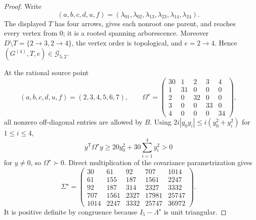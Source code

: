 \documentclass{article}
\begin{document}
\begin{proof}
Write
\[
 (a,b,c,d,u,f)=(\lambda_{01},\lambda_{02},\lambda_{13},
 \lambda_{23},\lambda_{14},\lambda_{24}).
\]
The displayed \(T\) has four arrows, gives each nonroot one parent, and reaches every vertex from \(0\); it is a rooted spanning arborescence.  Moreover \(D\setminus T=\{2\to3,2\to4\}\), the vertex order is topological, and \(e=2\to4\).  Hence \((G^{(4)},T,e)\in\mathcal G_{5,2}\).

At the rational source point
\[
 (a,b,c,d,u,f)=(2,3,4,5,6,7),
 \qquad
 \Omega^{\star}=
 \begin{pmatrix}
 30&1&2&3&4\\
 1&31&0&0&0\\
 2&0&32&0&0\\
 3&0&0&33&0\\
 4&0&0&0&34
 \end{pmatrix},
\tag{87}
\]
all nonzero off-diagonal entries are allowed by \(B\).  Using \(2i|y_0y_i|\le i(y_0^2+y_i^2)\) for \(1\le i\le4\),
\[
 y^{\mathsf T}\Omega^{\star} y
 \ge20y_0^2+30\sum_{i=1}^4y_i^2>0
\]
for \(y\ne0\), so \(\Omega^{\star}\succ0\).  Direct multiplication of the covariance parametrization gives
\[
 \Sigma^{\star}=
 \begin{pmatrix}
 30&61&92&707&1014\\
 61&155&187&1561&2247\\
 92&187&314&2327&3332\\
 707&1561&2327&17981&25747\\
 1014&2247&3332&25747&36972
 \end{pmatrix}.
\tag{88}
\]
It is positive definite by congruence because \(I_5-\Lambda^{\star}\) is unit triangular.


\end{proof}
\end{document}
